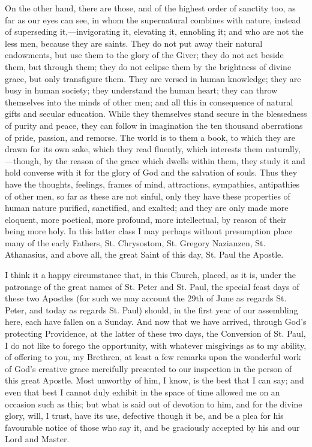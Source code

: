 On the other hand, there are those, and of the highest
order of sanctity too, as far as our eyes can see, in
whom the supernatural combines with nature, instead of
superseding it,—invigorating it, elevating it,
ennobling it; and who are not the less men, because they
are saints. They do not put away their natural
endowments, but use them to the glory of the Giver; they
do not act beside them, but through them; they do not
eclipse them by the brightness of divine grace, but only
transfigure them. They are versed in human knowledge;
they are busy in human society; they understand the human
heart; they can throw themselves into the minds of other
men; and all this in consequence of natural gifts and
secular education. While they themselves stand secure in
the blessedness of purity and peace, they can follow in
imagination the ten thousand aberrations of pride,
passion, and remorse. The world is to them a book, to
which they are drawn for its own sake, which they read
fluently, which interests them naturally,—though, by
the reason of the grace which dwells within them, they
study it and hold converse with it for the glory of God
and the salvation of souls. Thus they have the thoughts,
feelings, frames of mind, attractions, sympathies,
antipathies of other men, so far as these are not sinful,
only they have these properties of human nature purified,
sanctified, and exalted; and they are only made more
eloquent, more poetical, more profound, more
intellectual, by reason of their being more holy. In this
latter class I may perhaps without presumption place many
of the early Fathers, St. Chrysostom, St. Gregory
Nazianzen, St. Athanasius, and above all, the great Saint
of this day, St. Paul the Apostle.

I think it a happy circumstance that, in this Church,
placed, as it is, under the patronage of the great names
of St. Peter and St. Paul, the special feast days of
these two Apostles (for such we may account the 29th of
June as regards St. Peter, and today as regards St. Paul)
should, in the first year of our assembling here, each
have fallen on a Sunday. And now that we have arrived,
through God's protecting Providence, at the latter of
these two days, the Conversion of St. Paul, I do not like
to forego the opportunity, with whatever misgivings as to
my ability, of offering to you, my Brethren, at least a
few remarks upon the wonderful work of God's creative
grace mercifully presented to our inspection in the
person of this great Apostle. Most unworthy of him, I
know, is the best that I can say; and even that best I
cannot duly exhibit in the space of time allowed me on an
occasion such as this; but what is said out of devotion
to him, and for the divine glory, will, I trust, have its
use, defective though it be, and be a plea for his
favourable notice of those who say it, and be graciously
accepted by his and our Lord and Master.

